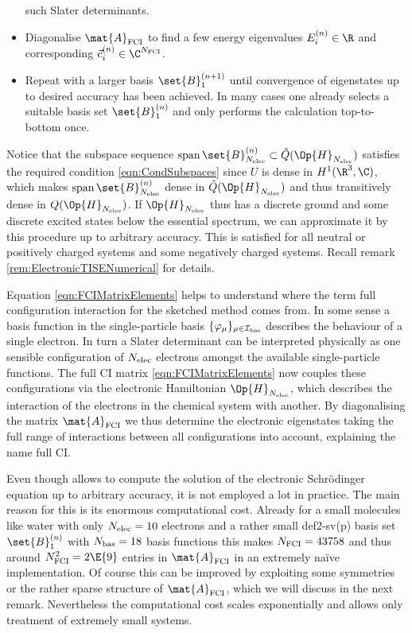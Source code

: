 \begin{rem}[Full CI]
\begin{itemize}
		such Slater determinants.
	\item Diagonalise $\mat{A}_\text{FCI}$ to find a few energy eigenvalues
		$E_i^{(n)} \in \R$ and corresponding 
		$\vec{c}^{(n)}_i \in \C^{\Nfci}$.
	\item Repeat with a larger basis $\set{B}_1^{(n+1)}$ until convergence
		of eigenstates up to desired accuracy has been achieved.
		In many cases one already selects a suitable basis set
		$\set{B}_1^{(n)}$ and only performs the calculation top-to-bottom once.
	\end{itemize}
	Notice that the subspace sequence
	$\spacespan \set{B}_{\Nelec}^{(n)} \subset \tilde{Q}(\Op{H}_{\Nelec})$
	satisfies the required condition \eqref{eqn:CondSubspaces}
	since $U$ is dense in $H^1(\R^3, \C)$,
	which makes $\spacespan \set{B}_{\Nelec}^{(n)}$
	dense in $\tilde{Q}(\Op{H}_{\Nelec})$
	and thus transitively dense in $Q(\Op{H}_{\Nelec})$.
	If $\Op{H}_{\Nelec}$ thus has a discrete ground and some discrete
	excited states below the essential spectrum,
	we can approximate it by this procedure up to arbitrary accuracy.
	This is satisfied for all neutral or positively charged systems
	and some negatively charged systems.
	Recall remark \vref{rem:ElectronicTISENumerical} for details.
\end{rem}
Equation \eqref{eqn:FCIMatrixElements} helps to understand
where the term full configuration interaction for the sketched
method comes from.
In some sense a basis function in the single-particle
basis $\{\varphi_\mu\}_{\mu\in\mathcal{I}_\text{bas}}$
describes the behaviour of a single electron.
In turn a Slater determinant can be interpreted physically
as one sensible configuration of $N_\text{elec}$ electrons
amongst the available single-particle functions.
The full CI matrix \eqref{eqn:FCIMatrixElements}
now couples these configurations
via the electronic Hamiltonian $\Op{H}_{\Nelec}$,
which describes the interaction of the electrons in the chemical
system with another.
By diagonalising the matrix $\mat{A}_\text{FCI}$ we thus determine
the electronic eigenstates taking the full range of interactions between
all configurations into account, explaining the name full CI.

Even though \FCI allows to compute the solution of the electronic
Schrödinger equation up to arbitrary accuracy,
it is not employed a lot in practice.
The main reason for this is its enormous computational cost.
Already for a small molecules like water with only
$N_\text{elec} = 10$ electrons and a rather small def2-sv(p) basis set
$\set{B}_1^{(n)}$ with $N_\text{bas} = 18$ basis functions this makes $N_\text{FCI} = 43758$
and thus around $\Nfci^2 = 2\E{9}$ entries in $\mat{A}_\text{FCI}$
in an extremely na\"{i}ve implementation.
Of course this can be improved by exploiting some symmetries
or the rather sparse structure of $\mat{A}_\text{FCI}$,
which we will discuss in the next remark.
Nevertheless the computational cost scales exponentially
and allows only treatment of extremely small systems.

